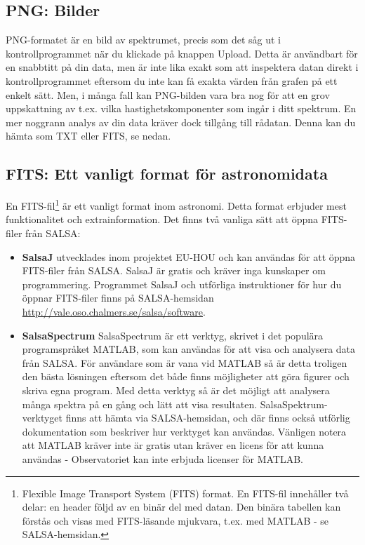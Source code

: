 \subsection{PNG: Bilder}
PNG-formatet är en bild av spektrumet, precis som det såg ut i kontrollprogrammet
när du klickade på knappen Upload. Detta är användbart för en snabbtitt på din data,
men är inte lika exakt som att inspektera datan direkt i kontrollprogrammet
eftersom du inte kan få exakta värden från grafen på ett enkelt sätt. 
Men, i många fall kan PNG-bilden vara bra nog för att en grov uppskattning
av t.ex. vilka hastighetskomponenter som ingår i ditt spektrum. En mer
noggrann analys av din data kräver dock tillgång till rådatan. Denna 
kan du hämta som TXT eller FITS, se nedan. 


\subsection{FITS: Ett vanligt format för astronomidata}
En FITS-fil\footnote{Flexible Image Transport System (FITS) format.  En FITS-fil
	innehåller två delar: en header följd av en binär del med datan. Den binära
	tabellen kan förstås och visas med FITS-läsande mjukvara, t.ex. med MATLAB - se
	SALSA-hemsidan. } är ett vanligt format inom astronomi. Detta format
	erbjuder mest funktionalitet och extrainformation. Det finns två vanliga sätt att
	öppna FITS-filer från SALSA:

\begin{itemize}
	\item \textbf{SalsaJ} utvecklades inom projektet EU-HOU och kan användas 
		för att öppna FITS-filer från SALSA.
		SalsaJ är gratis och kräver inga kunskaper om programmering. Programmet SalsaJ och utförliga instruktioner för hur du öppnar FITS-filer finns
		på SALSA-hemsidan {\url{http://vale.oso.chalmers.se/salsa/software}}.
	\item \textbf{SalsaSpectrum} SalsaSpectrum är ett verktyg, skrivet i det
		populära programspråket MATLAB, som kan användas för att visa och
		analysera data från SALSA. För användare som är vana vid MATLAB så är
		detta troligen den bästa lösningen eftersom det både finns möjligheter
		att göra figurer och skriva egna program. Med detta verktyg så är det
		möjligt att analysera många spektra på en gång och lätt att visa
		resultaten.  SalsaSpektrum-verktyget finns att hämta via
		SALSA-hemsidan, och där finns också utförlig dokumentation som
		beskriver hur verktyget kan användas. Vänligen notera att MATLAB kräver
		inte är gratis utan kräver en licens för att kunna användas -
		Observatoriet kan inte erbjuda licenser för MATLAB.
\end{itemize}

